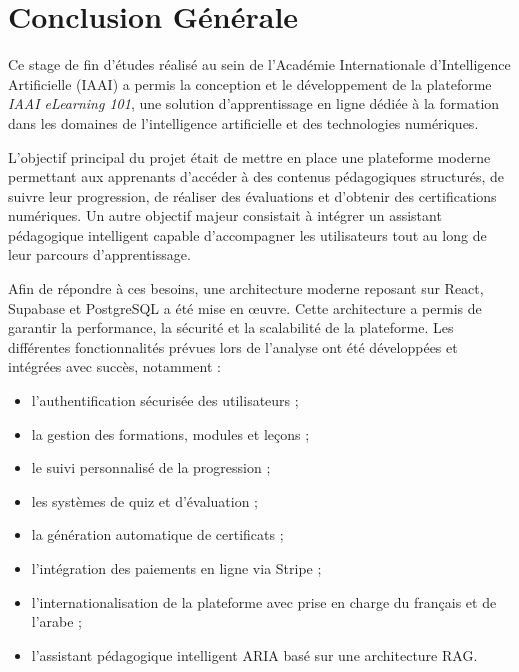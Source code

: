 \documentclass[12pt, a4paper]{report}
\begin{document}
\chapter*{Conclusion Générale}

Ce stage de fin d'études réalisé au sein de l'Académie Internationale d'Intelligence Artificielle (IAAI) a permis la conception et le développement de la plateforme \textit{IAAI eLearning 101}, une solution d'apprentissage en ligne dédiée à la formation dans les domaines de l'intelligence artificielle et des technologies numériques.

L'objectif principal du projet était de mettre en place une plateforme moderne permettant aux apprenants d'accéder à des contenus pédagogiques structurés, de suivre leur progression, de réaliser des évaluations et d'obtenir des certifications numériques. Un autre objectif majeur consistait à intégrer un assistant pédagogique intelligent capable d'accompagner les utilisateurs tout au long de leur parcours d'apprentissage.

Afin de répondre à ces besoins, une architecture moderne reposant sur React, Supabase et PostgreSQL a été mise en œuvre. Cette architecture a permis de garantir la performance, la sécurité et la scalabilité de la plateforme. Les différentes fonctionnalités prévues lors de l'analyse ont été développées et intégrées avec succès, notamment :

\begin{itemize}
    \item l'authentification sécurisée des utilisateurs ;
    \item la gestion des formations, modules et leçons ;
    \item le suivi personnalisé de la progression ;
    \item les systèmes de quiz et d'évaluation ;
    \item la génération automatique de certificats ;
    \item l'intégration des paiements en ligne via Stripe ;
    \item l'internationalisation de la plateforme avec prise en charge du français et de l'arabe ;
    \item l'assistant pédagogique intelligent ARIA basé sur une architecture RAG.
\end{itemize}
\end{document}
